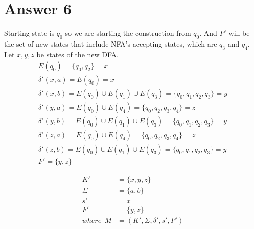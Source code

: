 \documentclass[12pt]{article}
\begin{document}
\section*{Answer 6}
\qquad Starting state is $q_0$ so we are starting the construction from $q_0$. And $F'$ will be the set of new states that include NFA's accepting states, which are $q_3$ and $q_4$. Let $x, y, z$ be states of the new DFA.
\begin{align*}
  E(q_0) = \{q_0, q_2\} = x\\
  \delta'(x, a) = E(q_0) = x\\
  \delta'(x, b) = E(q_0) \cup E(q_1) \cup E(q_3) = \{q_0, q_1, q_2, q_3\} = y\\
  \delta'(y, a) = E(q_0) \cup E(q_4) = \{q_0, q_2, q_3, q_4\} = z\\
  \delta'(y, b) = E(q_0) \cup E(q_1) \cup E(q_3) = \{q_0, q_1, q_2, q_3\} = y\\
  \delta'(z, a) = E(q_0) \cup E(q_4) = \{q_0, q_2, q_3, q_4\} = z\\
  \delta'(z, b) = E(q_0) \cup E(q_1) \cup E(q_3) = \{q_0, q_1, q_2, q_3\} = y\\
  F' = \{y, z\}
\end{align*}
\begin{minipage}{0.5\textwidth}
\end{minipage}\hfill
\begin{minipage}{0.5\textwidth}
  \begin{align*}
    K'         & = \{x, y, z\}\\
    \Sigma     & = \{a, b\}\\
    s'         & = x\\
    F'         & = \{y, z\}\\
    where\ \ M & = (K', \Sigma, \delta', s', F')
  \end{align*}
\end{minipage}
\end{document}
